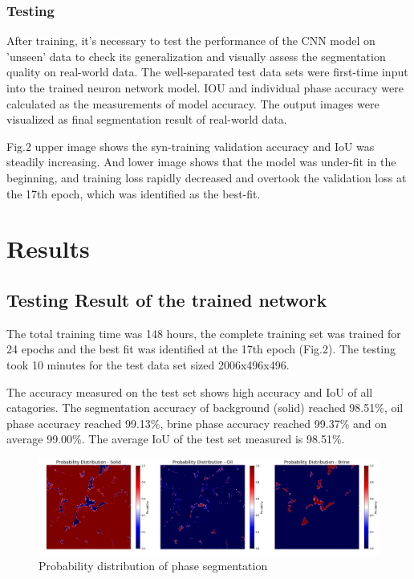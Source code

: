 \documentclass[draft,linenumbers]{agujournal2018}
\begin{document}
\subsubsection{Testing}
After training, it's necessary to test the performance of the CNN model on 'unseen' data to check its generalization and visually assess the segmentation quality on real-world data. The well-separated test data sets were first-time input into the trained neuron network model. IOU and individual phase accuracy were calculated as the measurements of model accuracy. The output images were visualized as final segmentation result of real-world data.


Fig.2 upper image shows the syn-training validation accuracy and IoU was steadily increasing. And lower image shows that the model was under-fit in the beginning, and training loss rapidly decreased and overtook the validation loss at the 17th epoch, which was identified as the best-fit. 

\section{Results}
\subsection{Testing Result of the trained network}

The total training time was 148 hours, the complete training set was trained for 24 epochs and the best fit was identified at the 17th epoch (Fig.2). The testing took 10 minutes for the test data set sized 2006x496x496.

The accuracy measured on the test set shows high accuracy and IoU of all catagories. The segmentation accuracy of background (solid) reached 98.51\%, oil phase accuracy reached 99.13\%, brine phase accuracy reached 99.37\% and on average 99.00\%.
The average IoU of the test set measured is 98.51\%.


\begin{figure}[h]
 \centering
 \includegraphics[width=33pc]{imgs/17_test_probmap.png}
 \caption{Probability distribution of phase segmentation}
 \label{fig3}
 \end{figure}
 
\end{document}
